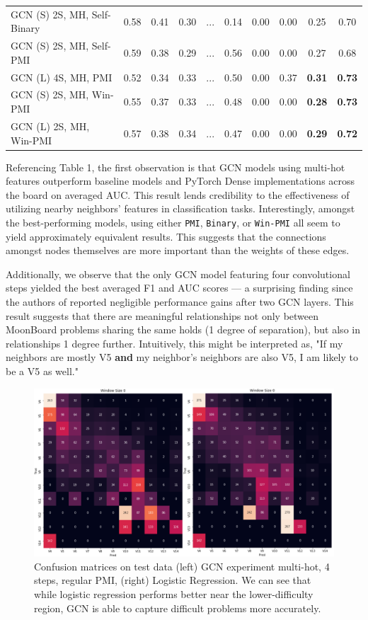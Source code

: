 \documentclass{article}
\begin{document}
\begin{table}[h!]
\begin{tabular}{@{}lccclccccc@{}}
GCN (S) 2S, MH, Self-Binary & 0.58  & 0.41  & 0.30  & ... & 0.14 & 0.00 & 0.00 & 0.25            & 0.70            \\
GCN (S) 2S, MH, Self-PMI    & 0.59  & 0.38  & 0.29  & ... & 0.56 & 0.00 & 0.00 & 0.27            & 0.68            \\
GCN (L) 4S, MH, PMI         & 0.52  & 0.34  & 0.33  & ... & 0.50 & 0.00 & 0.37 & \textbf{0.31}            & \textbf{0.73}            \\
GCN (S) 2S, MH, Win-PMI     & 0.55  & 0.37  & 0.33  & ... & 0.48 & 0.00 & 0.00 & \textbf{0.28}            & \textbf{0.73}            \\
GCN (L) 2S, MH, Win-PMI     & 0.57  & 0.38  & 0.34  & ... & 0.47 & 0.00 & 0.00 & \textbf{0.29}            & \textbf{0.72}            \\ \bottomrule
\end{tabular}
\end{table}

Referencing Table 1, the first observation is that GCN models using multi-hot features outperform baseline models and PyTorch Dense implementations across the board on averaged AUC. This result lends credibility to the effectiveness of utilizing nearby neighbors' features in classification tasks. Interestingly, amongst the best-performing models, using either \texttt{PMI}, \texttt{Binary}, or \texttt{Win-PMI} all seem to yield approximately equivalent results. This suggests that the connections amongst nodes themselves are more important than the weights of these edges. 

Additionally, we observe that the only GCN model featuring four convolutional steps yielded the best averaged F1 and AUC scores --- a surprising finding since the authors of \cite{yao2018graph} reported negligible performance gains after two GCN layers. This result suggests that there are meaningful relationships not only between MoonBoard problems sharing the same holds (1 degree of separation), but also in relationships 1 degree further. Intuitively, this might be interpreted as, "If my neighbors are mostly V5 \textbf{and} my neighbor's neighbors are also V5, I am likely to be a V5 as well."

\begin{figure}[h]
\centering
\includegraphics[width=.65\textwidth]{confusions}

\label{fig: Confusion matrices}
\caption{Confusion matrices on test data (left) GCN experiment multi-hot, 4 steps, regular PMI, (right) Logistic Regression. We can see that while logistic regression performs better near the lower-difficulty region, GCN is able to capture difficult problems more accurately.}
\end{figure}
\end{document}
